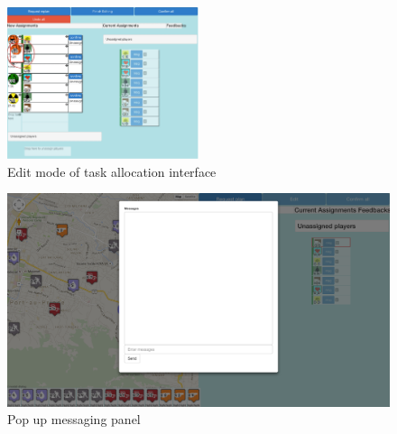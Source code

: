 \begin{figure}[h]
  \centering
  \includegraphics[width=0.5\textwidth]{img/study3/system/editmode}
  \caption{Edit mode of task allocation interface}
  \label{fig:study3editmode}
\end{figure}

\begin{figure}[h]
  \centering
  \includegraphics[width=1\textwidth]{img/study3/system/msgmode}
  \caption{Pop up messaging panel}
  \label{fig:study3msgmode}
\end{figure}


